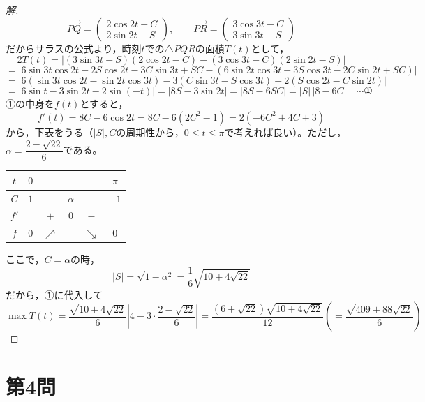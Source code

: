 \documentclass[../main.tex]{subfiles}
\begin{document}
\begin{proof}[解]
  \[
    \overrightarrow{PQ}=
    \begin{pmatrix}2\cos2t-C\\2\sin2t-S
    \end{pmatrix},\qquad
    \overrightarrow{PR}=
    \begin{pmatrix}3\cos3t-C\\3\sin3t-S
    \end{pmatrix}
  \]
  だからサラスの公式より，時刻$t$での$\triangle PQR$の面積$T(t)$として，
  \[
    2T(t)=\left|(3\sin3t-S)(2\cos2t-C)-(3\cos3t-C)(2\sin2t-S)\right|
  \]
  \[
    =\bigl|6\sin3t\cos2t-2S\cos2t-3C\sin3t+SC-(6\sin2t\cos3t-3S\cos3t-2C\sin2t+SC)\bigr|
  \]
  \[
    =\bigl|6(\sin3t\cos2t-\sin2t\cos3t)-3(C\sin3t-S\cos3t)-2(S\cos2t-C\sin2t)\bigr|
  \]
  \[
    =\bigl|6\sin t-3\sin2t-2\sin(-t)\bigr|
    =\bigl|8S-3\sin2t\bigr|
    =\bigl|8S-6SC\bigr|=|S|\,|8-6C| \quad \cdots \text{①}
  \]
  ①の中身を$f(t)$とすると，
  \[
    f'(t)=8C-6\cos2t=8C-6(2C^2-1)=2(-6C^2+4C+3)
  \]
  から，下表をうる（$|S|,C$の周期性から，$0\le t\le\pi$で考えれば良い）。ただし，$\alpha=\dfrac{2-\sqrt{22}}{6}$である。
  \begin{center}
    \begin{tabular}{c|ccccc}
      $t$ & $0$ & & & & $\pi$ \\
      \hline
      $C$ & $1$ & & $\alpha$ & & $-1$ \\
      \hline
      $f'$ & & $+$ & $0$ & $-$ & \\
      \hline
      $f$ & $0$ & $\nearrow$ & & $\searrow$ & $0$
    \end{tabular}
  \end{center}
  ここで，$C=\alpha$の時，
  \[
    |S|=\sqrt{1-\alpha^2}=\frac16\sqrt{10+4\sqrt{22}}
  \]
  だから，①に代入して
  \[
    \max T(t)=\frac{\sqrt{10+4\sqrt{22}}}{6}\left|4-3\cdot\frac{2-\sqrt{22}}{6}\right|
    =\frac{(6+\sqrt{22})\sqrt{10+4\sqrt{22}}}{12}
    \left(=\frac{\sqrt{409+88\sqrt{22}}}{6}\right)
  \]
\end{proof}

\newpage

\section*{第4問}
\end{document}

